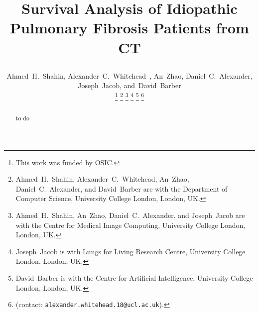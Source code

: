 \documentclass{IEEEtran}
\begin{document}
    \title{
        
        Survival Analysis of Idiopathic Pulmonary Fibrosis Patients from CT
    }
    
    \author{

        Ahmed~H.~Shahin,
        Alexander~C.~Whitehead~,
        An~Zhao,
        Daniel~C.~Alexander,
        Joseph~Jacob,
        and~David~Barber
    

        \thanks{
            This work was funded by \gls{OSIC}.
        }
        \thanks{
            Ahmed~H.~Shahin, Alexander~C.~Whitehead, An~Zhao, Daniel~C.~Alexander, and David~Barber are with the Department of Computer Science, University College London, London, UK.
        }
        \thanks{
            Ahmed~H.~Shahin, An~Zhao, Daniel~C.~Alexander, and Joseph~Jacob are with the Centre for Medical Image Computing, University College London, London, UK.
        }
        \thanks{
            Joseph~Jacob is with Lungs for Living Research Centre, University College London, London, UK.
        }
        \thanks{
            David~Barber is with the Centre for Artificial Intelligence, University College London, London, UK.
        }
        \thanks{
            (contact: \texttt{alexander.whitehead.18@ucl.ac.uk}).
        }
    }
    
    \pagestyle{plain}
    
    \maketitle
    
    \begin{abstract}
        to do
    \end{abstract}
    
        
    
    
    
    
    
    
    
    \AtNextBibliography{
    }
    \printbibliography
\end{document}
